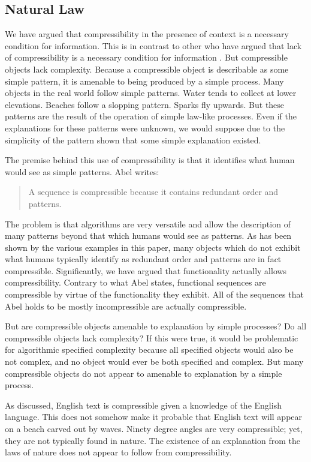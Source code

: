 \subsection{Natural Law}
We have argued that compressibility in the presence of context is a necessary condition for information.
This is in contrast to other who have argued that lack of compressibility is a necessary condition for information \cite{Abel2005}.
But compressible objects lack complexity.
Because a compressible object is describable as some simple pattern, it is amenable to being produced by a simple process.
Many objects in the real world follow simple patterns.
Water tends to collect at lower elevations.
Beaches follow a slopping pattern.
Sparks fly upwards.
But these patterns are the result of the operation of simple law-like processes.
Even if the explanations for these patterns were unknown, we would suppose due to the simplicity of the pattern shown that some simple explanation existed.

The premise behind this use of compressibility is that it identifies what human would see as simple patterns.
Abel writes:
\begin{quotation}
    A sequence is compressible because it contains redundant order and patterns. \cite{Abel2005}
\end{quotation}
The problem is that algorithms are very versatile and allow the description of many patterns beyond that which humans would see as patterns.
As has been shown by the various examples in this paper, many objects which do not exhibit what humans typically identify as redundant order and patterns are in fact compressible.
Significantly, we have argued that functionality actually allows compressibility.
Contrary to what Abel states, functional sequences are compressible by virtue of the functionality they exhibit.
All of the sequences that Abel holds to be mostly incompressible are actually compressible.

But are compressible objects amenable to explanation by simple processes?
Do all compressible objects lack complexity?
If this were true, it would be problematic for algorithmic specified complexity because all specified objects would also be not complex, and no object would ever be both specified and complex.
But many compressible objects do not appear to amenable to explanation by a simple process.

As discussed, English text is compressible given a knowledge of the English language.
This does not somehow make it probable that English text will appear on a beach carved out by waves.
Ninety degree angles are very compressible; yet, they are not typically found in nature.
The existence of an explanation from the laws of nature does not appear to follow from compressibility.

